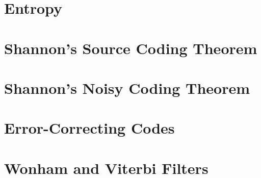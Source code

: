 \documentclass[../../../main.tex]{subfiles}
\begin{document}

\section{Entropy}
\section{Shannon's Source Coding Theorem}
\section{Shannon's Noisy Coding Theorem}
\section{Error-Correcting Codes}
\section{Wonham and Viterbi Filters}

\printbibliography[
    heading=subbibintoc,
    title={References}
]
\end{document}
